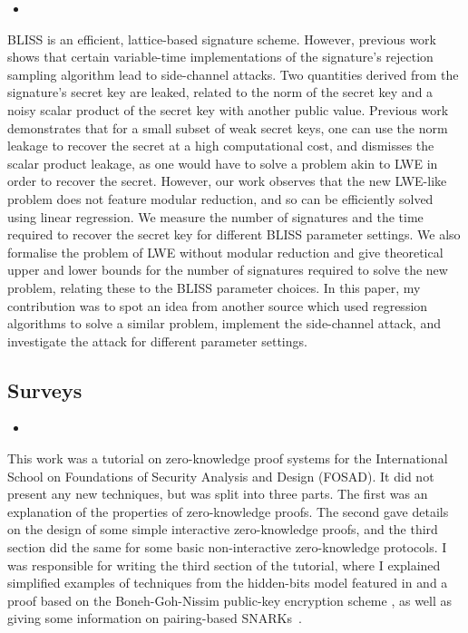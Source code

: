 \begin{itemize}
\item {}
\end{itemize}

BLISS \cite{DucasDLL13} is an efficient, lattice-based signature scheme. However, previous work \cite{EspitauFGT17} shows that certain variable-time implementations of the signature's rejection sampling algorithm lead to side-channel attacks. Two quantities derived from the signature's secret key are leaked, related to the norm of the secret key and a noisy scalar product of the secret key with another public value. Previous work \cite{EspitauFGT17} demonstrates that for a small subset of weak secret keys, one can use the norm leakage to recover the secret at a high computational cost, and dismisses the scalar product leakage, as one would have to solve a problem akin to LWE in order to recover the secret. However, our work observes that the new LWE-like problem does not feature modular reduction, and so can be efficiently solved using linear regression. We measure the number of signatures and the time required to recover the secret key for different BLISS parameter settings. We also formalise the problem of LWE without modular reduction and give theoretical upper and lower bounds for the number of signatures required to solve the new problem, relating these to the BLISS parameter choices. In this paper, my contribution was to spot an idea from another source which used regression algorithms to solve a similar problem, implement the side-channel attack, and investigate the attack for different parameter settings.

\subsection*{Surveys}

\begin{itemize}
\item {}
\end{itemize}

This work was a tutorial on zero-knowledge proof systems for the International School on Foundations of Security Analysis and Design (FOSAD). It did not present any new techniques, but was split into three parts. The first was an explanation of the properties of zero-knowledge proofs. The second gave details on the design of some simple interactive zero-knowledge proofs, and the third section did the same for some basic non-interactive zero-knowledge protocols. I was responsible for writing the third section of the tutorial, where I explained simplified examples of techniques from the hidden-bits model featured in \cite{Groth2010a} and a proof \cite{GOS12} based on the Boneh-Goh-Nissim public-key encryption scheme \cite{BonehGN05}, as well as giving some information on pairing-based SNARKs~\cite{Groth2010b,Lip12,Bitansky2012,Gennaro2013,Bitansky2013,PHGR13, C:BCGTV13,BCTV14}.

